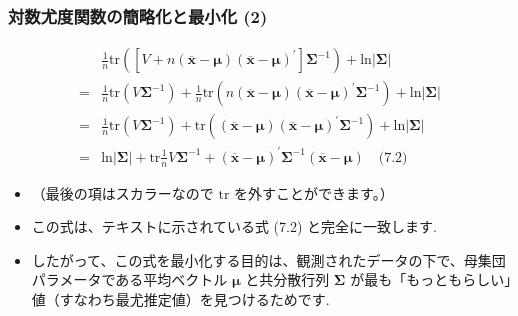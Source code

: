 \documentclass[aspectratio=169]{beamer}
\begin{document}
\begin{frame}
\frametitle{対数尤度関数の簡略化と最小化 (2)}
\begin{align*}
&\frac{1}{n}\text{tr}\left([V+n(\overline{\bm{x}}-\bm{\mu})(\overline{\bm{x}}-\bm{\mu})^{\prime}]\bm{\Sigma}^{-1}\right)+\text{ln}|\bm{\Sigma}| \\
=&\frac{1}{n}\text{tr}(V\bm{\Sigma}^{-1})+\frac{1}{n}\text{tr}(n(\overline{\bm{x}}-\bm{\mu})(\overline{\bm{x}}-\bm{\mu})^{\prime}\bm{\Sigma}^{-1})+\text{ln}|\bm{\Sigma}| \\
=&\frac{1}{n}\text{tr}(V\bm{\Sigma}^{-1})+\text{tr}((\overline{\bm{x}}-\bm{\mu})(\overline{\bm{x}}-\bm{\mu})^{\prime}\bm{\Sigma}^{-1})+\text{ln}|\bm{\Sigma}| \\
=&\text{ln}|\bm{\Sigma}|+\text{tr}\frac{1}{n}V\bm{\Sigma}^{-1}+(\overline{\bm{x}}-\bm{\mu})^{\prime}\bm{\Sigma}^{-1}(\overline{\bm{x}}-\bm{\mu}) \quad \text{(7.2)}
\end{align*}
\begin{itemize}
    \item （最後の項はスカラーなので $\text{tr}$ を外すことができます。）
    \item この式は、テキストに示されている式 (7.2) と完全に一致します.
    \item したがって、この式を最小化する目的は、観測されたデータの下で、母集団パラメータである平均ベクトル $\bm{\mu}$ と共分散行列 $\bm{\Sigma}$ が最も「もっともらしい」値（すなわち最尤推定値）を見つけるためです.
\end{itemize}
\end{frame}
\end{document}
